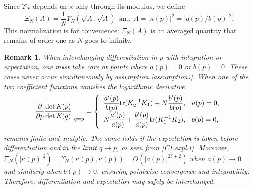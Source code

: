 \documentclass[pdflatex,sn-mathphys-num]{sn-jnl}
\theoremstyle{thmstyleone}
\newtheorem{remark}[theorem]{Remark}
\numberwithin{equation}{section}
\begin{document}
Since $\Upsilon_{N}$ depends on $\kappa$ only through its modulus, we define
\begin{equation}\label{Xi.def}
    \Xi_N(A)=\frac{1}{N}\Upsilon_N(\sqrt{A},\sqrt{A})\,\text{ and }\,A=|\kappa(p)|^2=|a(p)/b(p)|^2.
\end{equation}
This normalization is for convenience: $\Xi_N(A)$ is an averaged quantity that remains of order one as $N$ goes to infinity.
\begin{remark}
    When interchanging differentiation in $p$ with integration or expectation, one must take care at points where $a(p)=0$ or $b(p)=0$. These cases never occur simultaneously by assumption \eqref{assumption1}. When one of the two coefficient functions vanishes the logarithmic derivative
\begin{equation}
    \left.\frac{\partial}{\partial p}\frac{\det K(p)}{\det K(q)}\right|_{q=p}=\left\{\begin{array}{cl} \displaystyle \frac{a'(p)}{b(p)}{\rm tr}(K_2^{-1}K_1) +N\frac{b'(p)}{b(p)}, & a(p)=0, \\ \displaystyle N\frac{a'(p)}{a(p)} +\frac{b'(p)}{a(p)}{\rm tr}(K_1^{-1}K_2), & b(p)=0,\end{array}\right.
\end{equation}
remains finite and analytic. The same holds if the expectation is taken before differentiation and in the limit $q\to p$, as seen from \eqref{C1.expl.1}. Moreover, $\Xi_N(|\kappa(p)|^2)=\Upsilon_N(\kappa(p),\kappa(p))=O(|a(p)|^{2\delta+2})$ when $a(p)\to0$ and similarly when $b(p)\to0$, ensuring pointwise convergence and integrability. Therefore, differentiation and expectation may safely be interchanged.
\end{remark}
\end{document}
